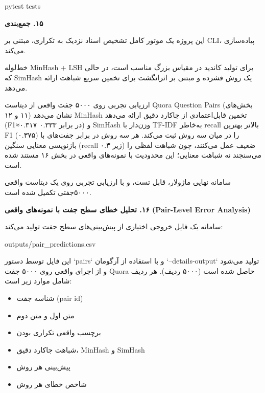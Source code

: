 \documentclass[11pt]{article}
\begin{document}
{\mycode
\begin{flushleft}
pytest tests
\end{flushleft}}

\medskip\noindent\hrulefill\medskip

\medskip
{\large\bfseries ‏۱۵. جمع‌بندی}\medskip


\noindent ‏این پروژه یک موتور کامل تشخیص اسناد نزدیک به تکراری، مبتنی بر CLI، پیاده‌سازی می‌کند.\par

\noindent ‏خط‌لوله MinHash + LSH برای تولید کاندید در مقیاس بزرگ مناسب است، در حالی که SimHash یک روش فشرده و مبتنی بر اثرانگشت برای تخمین سریع شباهت ارائه می‌دهد.\par

\noindent ‏ارزیابی تجربی روی ۵۰۰۰ جفت واقعی از دیتاست Quora Question Pairs (بخش‌های ۱۱ و ۱۲) نشان می‌دهد MinHash تخمین قابل‌اعتمادی از جاکارد دقیق ارائه می‌دهد (F1≈۰.۳۱۷ در برابر ۰.۳۳۳) و SimHash وزن‌دار با TF-IDF به‌خاطر recall بالاتر بهترین F1 (۰.۳۷۵) را در میان سه روش ثبت می‌کند. هر سه روش در برابر جفت‌های با بازنویسی معنایی سنگین (recall زیر ۰.۳) ضعیف عمل می‌کنند، چون شباهت لفظی را می‌سنجند نه شباهت معنایی؛ این محدودیت با نمونه‌های واقعی در بخش ۱۶ مستند شده است.\par

\noindent ‏سامانه نهایی ماژولار، قابل تست، و با ارزیابی تجربی روی یک دیتاست واقعی ۵۰۰۰‌جفتی تکمیل شده است.\par

\medskip\noindent\hrulefill\medskip

\medskip
{\large\bfseries ‏۱۶. تحلیل خطای سطح جفت با نمونه‌های واقعی (Pair-Level Error Analysis)}\medskip


\noindent ‏سامانه یک فایل خروجی اختیاری از پیش‌بینی‌های سطح جفت تولید می‌کند:\par

{\mycode
\begin{flushleft}
outputs/pair\_predictions.csv
\end{flushleft}}

\noindent ‏این فایل توسط دستور `pairs` و با استفاده از آرگومان `--details-output` تولید می‌شود و از اجرای واقعی روی ۵۰۰۰ جفت Quora حاصل شده است (۵۰۰۰ ردیف). هر ردیف شامل موارد زیر است:\par

\begin{itemize}

\item ‏شناسه جفت (pair id)

\item ‏متن اول و متن دوم

\item ‏برچسب واقعی تکراری بودن

\item ‏شباهت جاکارد دقیق، MinHash و SimHash

\item ‏پیش‌بینی هر روش

\item ‏شاخص خطای هر روش

\end{itemize}
\end{document}
